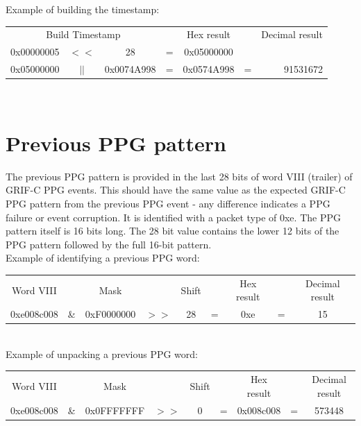 \documentclass[letterpaper,12pt,notitlepage]{report}
\begin{document}
Example of building the timestamp:\\

\begin{tabular}{ccccccr}
\multicolumn{3}{c}{Build Timestamp} & & Hex result & & Decimal result\\
0x00000005 & $<<$ & 28 & = & 0x05000000\\
0x05000000 & $||$ & 0x0074A998 & = & 0x0574A998 & = & 91531672\\
\end{tabular}\\

\section{Previous PPG pattern}
The previous PPG pattern is provided in the last 28 bits of word VIII (trailer) of GRIF-C PPG events. This should have the same value as the expected GRIF-C PPG pattern from the previous PPG event - any difference indicates a PPG failure or event corruption. It is identified with a packet type of 0xe. The PPG pattern itself is 16 bits long. The 28 bit value contains the lower 12 bits of the PPG pattern followed by the full 16-bit pattern.\\

 Example of identifying a previous PPG word:\\

\begin{tabular}{ccccccccc}
Word VIII &  & Mask & & Shift & & Hex result & & Decimal result\\
0xe008c008 & \& & 0xF0000000 & $>>$ & 28 & = & 0xe & = & 15 \\
\end{tabular}\\

Example of unpacking a previous PPG word:\\

\begin{tabular}{ccccccccc}
Word VIII &  & Mask & & Shift & & Hex result & & Decimal result\\
0xe008c008 & \& & 0x0FFFFFFF & $>>$ & 0 & = & 0x008c008 & = & 573448 \\
\end{tabular}


\end{document}
